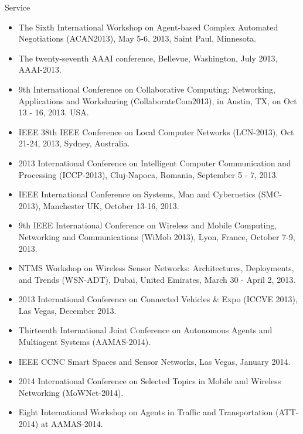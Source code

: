 \begin{category}{Service}
\begin{itemize}
\item The Sixth International Workshop on Agent-based Complex Automated Negotiations (ACAN2013), May 5-6, 2013, Saint Paul, Minnesota.

\item The twenty-seventh AAAI conference, Bellevue, Washington, July 2013, AAAI-2013.

\item 9th International Conference on Collaborative Computing: Networking, Applications and Worksharing  (CollaborateCom2013),  in Austin, TX, on Oct 13 - 16, 2013. USA.

\item IEEE 38th IEEE Conference on Local Computer Networks (LCN-2013), Oct 21-24, 2013, Sydney, Australia.

\item 2013 International Conference on Intelligent
Computer Communication and Processing (ICCP-2013), Cluj-Napoca, Romania, September 5 - 7, 2013.

\item IEEE International Conference on Systems, Man and Cybernetics (SMC-2013), Manchester UK, October 13-16, 2013.

\item 9th IEEE International Conference on Wireless and Mobile Computing, Networking and Communications (WiMob 2013), Lyon, France, October 7-9, 2013.

\item NTMS Workshop on Wireless Sensor Networks: Architectures, Deployments, and Trends (WSN-ADT), Dubai, United Emirates, March 30 - April 2, 2013.

\item 2013 International Conference on Connected Vehicles \& Expo (ICCVE 2013), Las Vegas, December 2013.

\item Thirteenth International Joint Conference on Autonomous Agents and Multiagent Systems (AAMAS-2014).

\item IEEE CCNC Smart Spaces and Sensor Networks, Las Vegas, January 2014.

\item 2014 International Conference on Selected Topics in Mobile and Wireless Networking (MoWNet-2014).

\item Eight International Workshop on Agents in Traffic and Transportation (ATT-2014) at AAMAS-2014.


\end{itemize}
\end{category}
